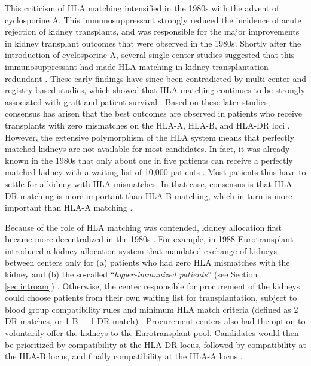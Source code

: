 \documentclass[11pt,twoside,]{book}
\begin{document}
This criticism of HLA matching intensified in the 1980s with the advent of cyclosporine
A. This immunosuppressant strongly reduced the incidence of acute rejection of kidney
transplants, and was responsible for the major improvements in kidney transplant
outcomes that were observed in the 1980s. Shortly after the introduction of
cyclosporine A, several single-center studies
suggested that this immunosuppressant had made HLA matching in kidney transplantation
redundant \citep{greensteinEvidenceThatZero1990, harfmannRenalTransplantationUsing1989}.
These early findings have since been contradicted by multi-center and
registry-based studies, which showed that HLA matching continues to be strongly
associated with graft and patient survival \citep{opelzCORRELATIONHLAMATCHING1985, Opelz2007}.
\newpage
Based on these later studies, consensus has arisen that the best outcomes are observed
in patients who receive transplants with zero mismatches on the HLA-A, HLA-B,
and HLA-DR loci \citep{opelzCORRELATIONHLAMATCHING1985, morrisAnalysisFactorsThat1999}. However,
the extensive polymorphism of the HLA system means that perfectly matched kidneys
are not available for most candidates. In fact, it was already known in the 1980s
that only about one in five patients can receive a perfectly matched kidney
with a waiting list of 10,000 patients \citep{CICCIARELLI1987}. Most patients
thus have to settle for a kidney with HLA mismatches. In that case, consensus is
that HLA-DR matching is more important than HLA-B matching, which in turn is more
important than HLA-A matching \citep{Ting1985, joyseyTissueTypingPolicy1989, thorogood1990}.

Because of the role of HLA matching was contended, kidney allocation first
became more decentralized in the 1980s \citep{bakJensenShareNotShare2008}. For example,
in 1988 Eurotransplant introduced a kidney allocation system that mandated
exchange of kidneys between centers only for (a) patients who had zero HLA mismatches
with the kidney and (b) the so-called ``\emph{hyper-immunized patients}'' (see Section \ref{sec:introam})
\citep{HaaseKromwijk1999}. Otherwise, the center responsible for procurement of the kidneys
could choose patients from their own waiting list for transplantation, subject to blood group
compatibility rules and minimum HLA match criteria (defined as 2 DR matches, or
1 B + 1 DR match) \citep{HaaseKromwijk1999}. Procurement centers also had the option to
voluntarily offer the kidneys to the Eurotransplant pool. Candidates would then be prioritized by
compatibility at the HLA-DR locus, followed by compatibility at the HLA-B locus,
and finally compatibility at the HLA-A locus \citep{HaaseKromwijk1999}.
\end{document}
